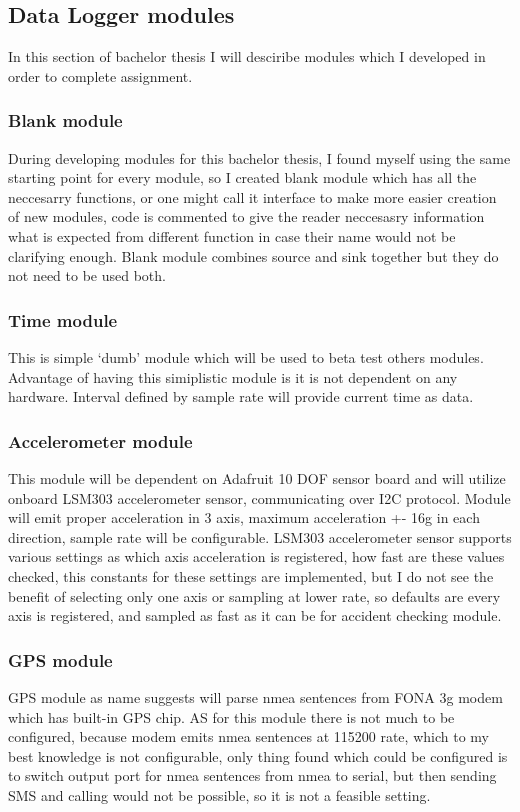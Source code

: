 \subsection{Data Logger modules}

In this section of bachelor thesis I will desciribe modules which I developed in order to complete assignment.
\subsubsection{Blank module} %
\label{ssub:blank_module}
During developing modules for this bachelor thesis, I found myself using the same starting point for every module, so I created blank module which has all the neccesarry functions, or one might call it interface to make more easier creation of new modules,
code is commented to give the reader neccesasry information what is expected from different function in case their name would not be clarifying enough. Blank module combines source and sink together but they do not need to be used both.

\subsubsection{Time module} %
\label{ssub:time_module}
This is simple `dumb' module which will be used to beta test others modules. Advantage of having this simiplistic module is it is not dependent on any hardware. Interval defined by sample rate will provide current time as data.
\subsubsection{Accelerometer module} %
This module will be dependent on Adafruit 10 DOF sensor board and will utilize onboard LSM303 accelerometer sensor, communicating over I2C protocol. Module will emit proper acceleration in 3 axis, maximum acceleration +- 16g in each direction, sample rate will be configurable. LSM303 accelerometer sensor supports various settings as which axis acceleration is registered, how fast are these values checked, this constants for these settings are implemented, but I do not see the benefit of selecting only one axis or sampling at lower rate, so defaults are every axis is registered, and sampled as fast as it can be for accident checking module.
\label{ssub:accelerometer_module}
\subsubsection{GPS module} %
\label{ssub:gps_module}
GPS module as name suggests will parse nmea sentences from FONA 3g modem which has built-in GPS chip. AS for this module there is not much to be configured, because modem emits nmea sentences at 115200 rate, which to my best knowledge is not configurable, only thing found which could be configured is to switch output port for nmea sentences from nmea to serial, but then sending SMS and calling would not be possible, so it is not a feasible setting.
